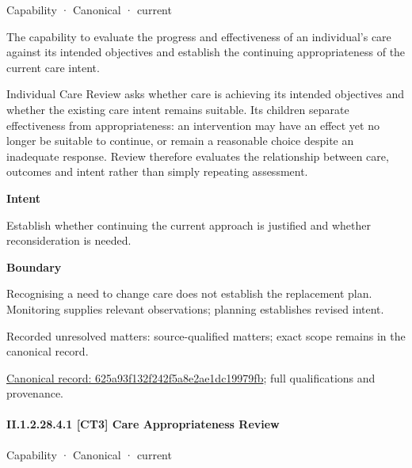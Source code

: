 \label{element:625a93f132f242f5a8e2ae1dc19979fb}
{\small Capability · Canonical · current}\par

The capability to evaluate the progress and effectiveness of an individual's care against its intended objectives and establish the continuing appropriateness of the current care intent.



Individual Care Review asks whether care is achieving its intended objectives and whether the existing care intent remains suitable. Its children separate effectiveness from appropriateness: an intervention may have an effect yet no longer be suitable to continue, or remain a reasonable choice despite an inadequate response. Review therefore evaluates the relationship between care, outcomes and intent rather than simply repeating assessment.



\textbf{Intent}



Establish whether continuing the current approach is justified and whether reconsideration is needed.



\textbf{Boundary}



Recognising a need to change care does not establish the replacement plan. Monitoring supplies relevant observations; planning establishes revised intent.


{\small Recorded unresolved matters: source-qualified matters; exact scope remains in the canonical record.}\par
{\footnotesize \href{../../../../continuum/strategy/capability/625a93f132f242f5a8e2ae1dc19979fb.md}{Canonical record: 625a93f132f242f5a8e2ae1dc19979fb}; full qualifications and provenance.}\par
\paragraph*{II.1.2.28.4.1 [CT3] Care Appropriateness Review}
\label{navigation:II.1.2.28.4.1}

\label{element:5eac5fb73e31416288d8c992805b33cb}
{\small Capability · Canonical · current}\par

